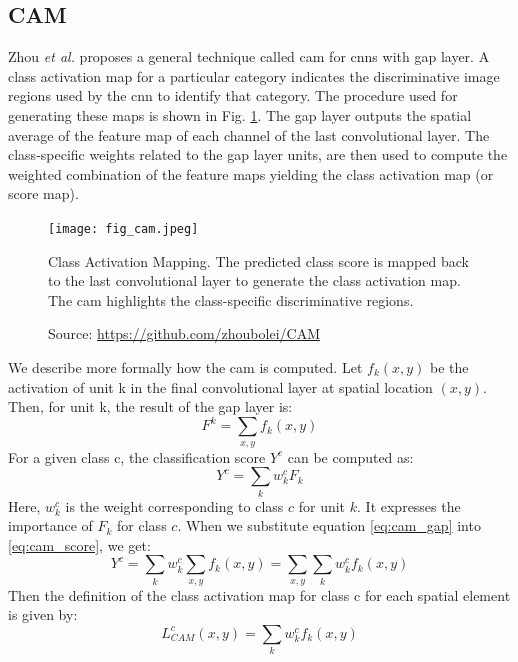 \subsection{CAM} \label{sec:cam}
Zhou \textit{et al.} proposes a general technique called \acrfull{cam} for \acrshort{cnn}s with \acrshort{gap} layer. A class activation map for a particular category indicates the discriminative image regions used by the
\acrshort{cnn} to identify that category. The procedure used for generating these maps is shown in Fig. \ref{fig:cam}. The \acrshort{gap} layer outputs the spatial average of the feature map of each channel of the last convolutional layer. The class-specific weights related to the \acrshort{gap} layer units, are then used to compute the weighted combination of the feature maps yielding the class activation map (or score map).
\begin{figure}[ht]
    \begin{center}       
    \texttt{[image: fig\_cam.jpeg]}
    \caption[Class Activation Mapping]{Class Activation Mapping. The predicted class score is mapped back to the last convolutional layer to generate the class activation map. The \acrshort{cam} highlights the class-specific discriminative regions.}
    \caption*{Source: \href{https://github.com/zhoubolei/CAM}{https://github.com/zhoubolei/CAM}}
    \label{fig:cam}
    \end{center}
\end{figure}

We describe more formally how the \acrshort{cam} is computed. Let $f_{k}(x,y)$ be the activation of unit k in the final convolutional layer at spatial location $(x,y)$. Then, for unit k, the result of the \acrshort{gap} layer is:
\begin{equation} \label{eq:cam_gap}
    F^{k} = \sum_{x,y}f_{k}(x,y)
\end{equation}
For a given class c, the classification score $Y^{c}$ can be computed as:
\begin{equation} \label{eq:cam_score}
    Y^{c} = \sum_{k}w_{k}^{c}F_{k}
\end{equation}
Here, $w_{k}^{c}$ is the weight corresponding to class $c$ for unit $k$. It expresses the importance of $F_{k}$ for class $c$.
When we substitute equation \ref{eq:cam_gap} into \ref{eq:cam_score}, we get:
\begin{equation} \label{eq:cam_score2}
    Y^{c} = \sum_{k}w_{k}^{c}\sum_{x,y}f_{k}(x,y) = \sum_{x,y}\sum_{k}w_{k}^{c}f_{k}(x,y)
\end{equation}
Then the definition of the class activation map for class c for each spatial element is given by:
\begin{equation} \label{eq:cam_map}
    L_{CAM}^{c}(x,y) = \sum_{k}w_{k}^{c}f_{k}(x,y)
\end{equation}

